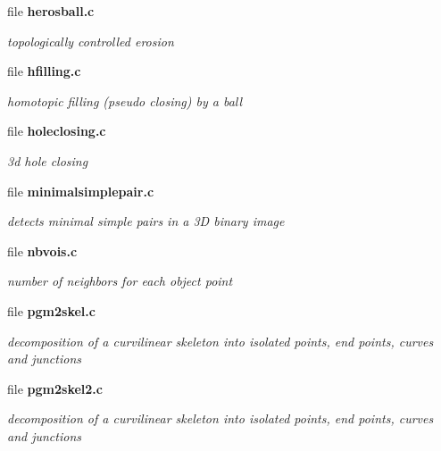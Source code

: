\begin{CompactItemize}
\item 
file {\bf herosball.c}
\begin{CompactList}\small\item\em topologically controlled erosion \item\end{CompactList}

\item 
file {\bf hfilling.c}
\begin{CompactList}\small\item\em homotopic filling (pseudo closing) by a ball \item\end{CompactList}

\item 
file {\bf holeclosing.c}
\begin{CompactList}\small\item\em 3d hole closing \item\end{CompactList}

\item 
file {\bf minimalsimplepair.c}
\begin{CompactList}\small\item\em detects minimal simple pairs in a 3D binary image \item\end{CompactList}

\item 
file {\bf nbvois.c}
\begin{CompactList}\small\item\em number of neighbors for each object point \item\end{CompactList}

\item 
file {\bf pgm2skel.c}
\begin{CompactList}\small\item\em decomposition of a curvilinear skeleton into isolated points, end points, curves and junctions \item\end{CompactList}

\item 
file {\bf pgm2skel2.c}
\begin{CompactList}\small\item\em decomposition of a curvilinear skeleton into isolated points, end points, curves and junctions \item\end{CompactList}


\end{CompactItemize}
